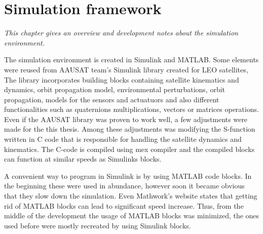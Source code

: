 \chapter{Simulation framework} \label{chap:G}
\textit{This chapter gives an overview and development notes about the simulation environment.}


The simulation environment is created in Simulink and MATLAB. Some elements were reused from AAUSAT team's Simulink library created for LEO satellites, 
The library incorporates building blocks containing satellite kinematics and dynamics, orbit propagation model, environmental perturbations, orbit propagation, models for the sensors and actuatuors and also different functionalities such as quaternions multiplications, vectors or matrices operations. Even if the AAUSAT library was proven to work well, a few adjustments were made for the this thesis. Among these adjustments was modifying the S-function written in C code that is responsible for handling the satellite dynamics and kinematics. The C-code is compiled using mex compiler and the compiled blocks can function at similar speeds as Simulinks blocks.

A convenient way to program in Simulink is by using MATLAB code blocks. In the beginning these were used in abundance, however soon it became obvious that they slow down the simulation. Even Mathwork's website states that getting rid of MATLAB blocks can lead to significant speed increase. Thus, from the middle of the development the usage of MATLAB blocks was minimized, the ones used before were mostly recreated by using Simulink blocks.


